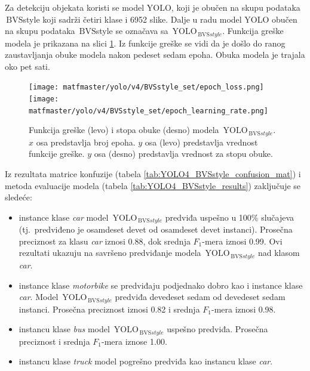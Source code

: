 \documentclass[12pt,oneside]{memoir}
\newcommand{\yolo}{\ensuremath{\,\textrm{YOLO}}}
\newcommand{\bvs}{\ensuremath{\,\textrm{BVS}}}
\begin{document}
Za detekciju objekata koristi se model YOLO, koji je obučen na skupu podataka \bvs{style} koji sadrži četiri klase i 6952 slike. Dalje u radu model YOLO obučen na skupu podataka \bvs{style} se označava sa $\yolo_{\bvs{style}}$. Funkcija greške modela je prikazana na slici \ref{fig:YOLO4_BVSstyle_loss}. Iz funkcije greške se vidi da je došlo do ranog zaustavljanja obuke modela nakon pedeset sedam epoha. Obuka modela je trajala oko pet sati.


\begin{figure}[!ht]
\centering
    \texttt{[image: matfmaster/yolo/v4/BVSstyle\_set/epoch\_loss.png]}
    \texttt{[image: matfmaster/yolo/v4/BVSstyle\_set/epoch\_learning\_rate.png]}
\caption{Funkcija greške (levo) i stopa obuke (desno) modela $\yolo_{\bvs{style}}$. $x$ osa predstavlja broj epoha. $y$ osa (levo) predstavlja vrednost funkcije greške. $y$ osa (desno) predstavlja vrednost za stopu obuke.}
\label{fig:YOLO4_BVSstyle_loss}
\end{figure}

Iz rezultata matrice konfuzije (tabela \ref{tab:YOLO4_BVSstyle_confusion_mat}) i metoda evaluacije modela (tabela \ref{tab:YOLO4_BVSstyle_results}) zaključuje se sledeće:
\begin{itemize}
    \item instance klase \textit{car} model $\yolo_{\bvs{style}}$ predviđa uspešno u 100\% slučajeva (tj.~predviđeno je osamdeset devet od osamdeset devet instanci). Prosečna preciznost za klasu \textit{car} iznosi 0.88, dok srednja $F_1$-mera iznosi 0.99. Ovi rezultati ukazuju na savršeno predviđanje modela $\yolo_{\bvs{style}}$ nad klasom \textit{car}.
    \item instance klase \textit{motorbike} se predviđaju podjednako dobro kao i instance klase \textit{car}. Model $\yolo_{\bvs{style}}$ predviđa devedeset sedam od devedeset sedam instanci. Prosečna preciznost iznosi 0.82 i srednja $F_1$-mera iznosi 0.98.
    \item instancu klase \textit{bus} model $\yolo_{\bvs{style}}$ uspešno predviđa. Prosečna preciznost i srednja $F_1$-mera iznose 1.00.
    \item instancu klase \textit{truck} model pogrešno predviđa kao instancu klase \textit{car}. 
\end{itemize}
\end{document}
